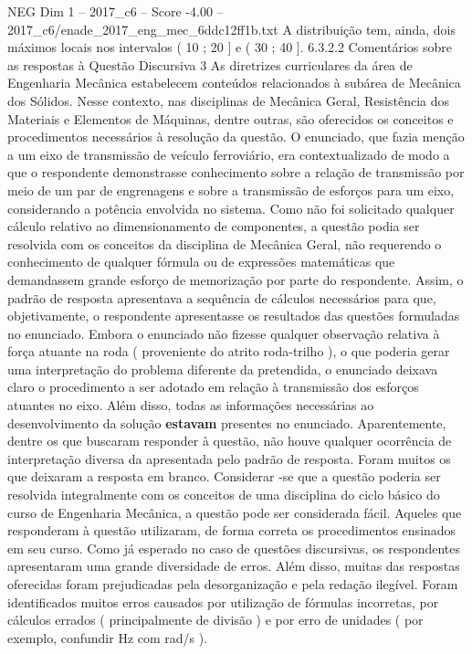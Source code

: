 \begin{textsample}{NEG Dim 1 – 2017\_c6 – Score -4.00 – 2017\_c6/enade\_2017\_eng\_mec\_6ddc12ff1b.txt}
A distribuição tem, ainda, dois máximos locais nos intervalos ( 10 ; 20 ] e ( 30 ; 40 ]. 6.3.2.2 Comentários sobre as respostas à Questão Discursiva 3 As diretrizes curriculares da área de Engenharia Mecânica estabelecem conteúdos relacionados à subárea de Mecânica dos Sólidos.
Nesse contexto, nas disciplinas de Mecânica Geral, Resistência dos Materiais e Elementos de Máquinas, dentre outras, são oferecidos os conceitos e procedimentos necessários à resolução da questão.
O enunciado, que fazia menção a um eixo de transmissão de veículo ferroviário, era contextualizado de modo a que o respondente demonstrasse conhecimento sobre a relação de transmissão por meio de um par de engrenagens e sobre a transmissão de esforços para um eixo, considerando a potência envolvida no sistema.
Como não foi solicitado qualquer cálculo relativo ao dimensionamento de componentes, a questão podia ser resolvida com os conceitos da disciplina de Mecânica Geral, não requerendo o conhecimento de qualquer fórmula ou de expressões matemáticas que demandassem grande esforço de memorização por parte do respondente.
Assim, o padrão de resposta apresentava a sequência de cálculos necessários para que, objetivamente, o respondente apresentasse os resultados das questões formuladas no enunciado.
Embora o enunciado não fizesse qualquer observação relativa à força atuante na roda ( proveniente do atrito roda-trilho ), o que poderia gerar uma interpretação do problema diferente da pretendida, o enunciado deixava claro o procedimento a ser adotado em relação à transmissão dos esforços atuantes no eixo.
Além disso, todas as informações necessárias ao desenvolvimento da solução \textbf{estavam} presentes no enunciado.
Aparentemente, dentre os que buscaram responder à questão, não houve qualquer ocorrência de interpretação diversa da apresentada pelo padrão de resposta.
Foram muitos os que deixaram a resposta em branco.
Considerar -se que a questão poderia ser resolvida integralmente com os conceitos de uma disciplina do ciclo básico do curso de Engenharia Mecânica, a questão pode ser considerada fácil.
Aqueles que responderam à questão utilizaram, de forma correta os procedimentos ensinados em seu curso.
Como já esperado no caso de questões discursivas, os respondentes apresentaram uma grande diversidade de erros.
Além disso, muitas das respostas oferecidas foram prejudicadas pela desorganização e pela redação ilegível.
Foram identificados muitos erros causados por utilização de fórmulas incorretas, por cálculos errados ( principalmente de divisão ) e por erro de unidades ( por exemplo, confundir Hz com rad/s ).

\end{textsample}
